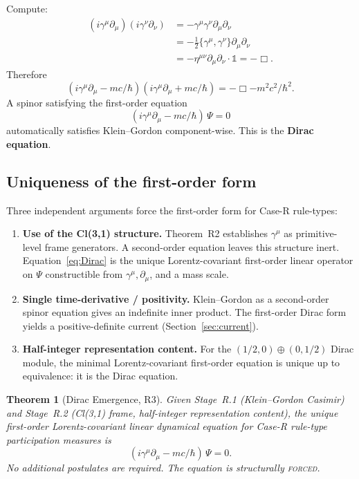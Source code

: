 \documentclass[11pt,a4paper]{article}
\newtheorem{theorem}{Theorem}[section]
\begin{document}
Compute:
\begin{align}
(i\gamma^\mu \partial_\mu)(i\gamma^\nu \partial_\nu)
&= -\gamma^\mu \gamma^\nu \partial_\mu \partial_\nu \nonumber \\
&= -\tfrac{1}{2}\{\gamma^\mu, \gamma^\nu\} \partial_\mu \partial_\nu \nonumber \\
&= -\eta^{\mu\nu} \partial_\mu \partial_\nu \cdot \mathbb{1} = -\Box.
\end{align}
Therefore
\begin{equation}
(i\gamma^\mu \partial_\mu - mc/\hbar)(i\gamma^\mu \partial_\mu + mc/\hbar) = -\Box - m^2 c^2/\hbar^2.
\end{equation}
A spinor satisfying the first-order equation
\begin{equation}
\boxed{(i\gamma^\mu \partial_\mu - mc/\hbar)\, \Psi = 0}
\label{eq:Dirac}
\end{equation}
automatically satisfies Klein--Gordon component-wise. This is the \textbf{Dirac equation}.

\subsection{Uniqueness of the first-order form}

Three independent arguments force the first-order form for Case-R rule-types:
\begin{enumerate}
  \item \textbf{Use of the Cl(3,1) structure.} Theorem~R2 establishes $\gamma^\mu$ as primitive-level frame generators. A second-order equation leaves this structure inert. Equation~\eqref{eq:Dirac} is the unique Lorentz-covariant first-order linear operator on $\Psi$ constructible from $\gamma^\mu, \partial_\mu$, and a mass scale.
  \item \textbf{Single time-derivative / positivity.} Klein--Gordon as a second-order spinor equation gives an indefinite inner product. The first-order Dirac form yields a positive-definite current (Section~\ref{sec:current}).
  \item \textbf{Half-integer representation content.} For the $(1/2, 0) \oplus (0, 1/2)$ Dirac module, the minimal Lorentz-covariant first-order equation is unique up to equivalence: it is the Dirac equation.
\end{enumerate}

\begin{theorem}[Dirac Emergence, R3]
Given Stage~R.1 (Klein--Gordon Casimir) and Stage~R.2 (Cl(3,1) frame, half-integer representation content), the unique first-order Lorentz-covariant linear dynamical equation for Case-R rule-type participation measures is
\begin{equation}
(i\gamma^\mu \partial_\mu - mc/\hbar)\, \Psi = 0.
\end{equation}
No additional postulates are required. The equation is structurally \textsc{forced}.
\end{theorem}
\end{document}
